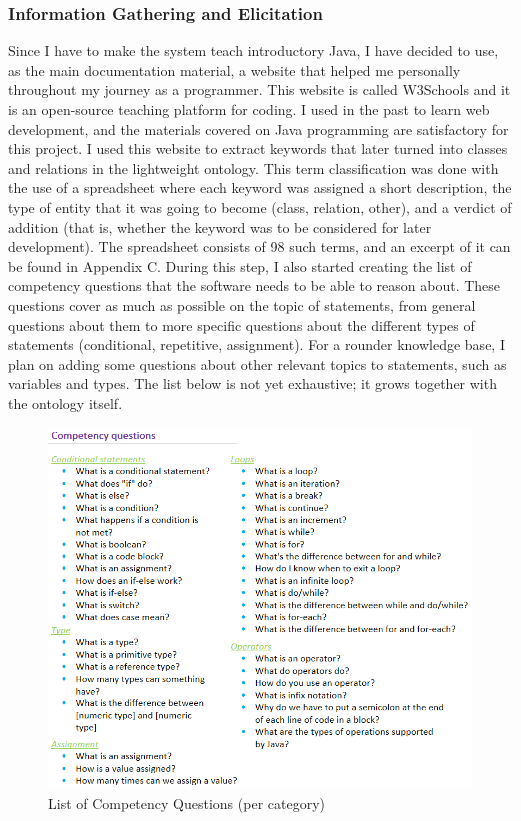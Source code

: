 \documentclass[titlepage]{article}
\begin{document}
\subsubsection{Information Gathering and Elicitation}
Since I have to make the system teach introductory Java, I have decided to use, as the main documentation material, a website that helped me personally throughout my journey as a programmer. This website is called W3Schools\cite{w3java} and it is an open-source teaching platform for coding. I used in the past to learn web development, and the materials covered on Java programming are satisfactory for this project.
\newline
I used this website to extract keywords that later turned into classes and relations in the lightweight ontology. This term classification was done with the use of a spreadsheet where each keyword was assigned a short description, the type of entity that it was going to become (class, relation, other), and a verdict of addition (that is, whether the keyword was to be considered for later development). The spreadsheet consists of 98 such terms, and an excerpt of it can be found in Appendix C.
\newline
During this step, I also started creating the list of competency questions that the software needs to be able to reason about. These questions cover as much as possible on the topic of statements, from general questions about them to more specific questions about the different types of statements (conditional, repetitive, assignment). For a rounder knowledge base, I plan on adding some questions about other relevant topics to statements, such as variables and types. The list below is not yet exhaustive; it grows together with the ontology itself.
\newline
\begin{figure}[h!]
\includegraphics[scale=0.7, center]{competency.png}
\caption{List of Competency Questions (per category)}
\end{figure}
\end{document}
